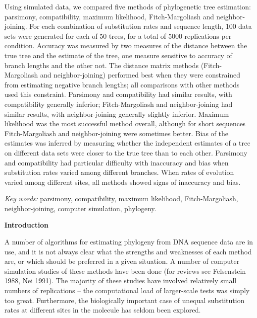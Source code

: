 	Using simulated data, we compared five methods of 
phylogenetic tree estimation:  parsimony, compatibility, 
maximum likelihood, Fitch-Margoliash and neighbor-joining.  For 
each combination of substitution rates and sequence length, 100 data 
sets were generated for each of 50 trees, for a total of 5000 
replications per condition.   Accuracy was measured by two measures of the
distance between the true tree and the estimate of the tree, one measure
sensitive to accuracy of branch lengths and the other not.  The distance
matrix methods (Fitch-Margoliash and neighbor-joining) performed best
when they were constrained from estimating negative branch lengths; all
comparisons with other methods used this constraint.  Parsimony
and compatibility had similar results, with compatibility generally
inferior; Fitch-Margoliash and neighbor-joining had similar results, with
neighbor-joining generally slightly inferior.  Maximum likelihood was the most 
successful method overall, although for short sequences Fitch-Margoliash 
and neighbor-joining were sometimes better.  Bias of the
estimates was inferred by measuring whether the independent estimates of a
tree on different data sets were closer to the true tree than to each other.
Parsimony and compatibility had particular difficulty with 
inaccuracy and bias when substitution rates varied among different branches.  
When rates of evolution varied among different sites, all methods showed signs 
of inaccuracy and bias.

\bigskip

\bigskip

{\it Key words:}  parsimony, compatibility, 
maximum likelihood, Fitch-Margoliash, neighbor-joining, computer simulation, phylogeny.
\newpage


\noindent
{\bf Introduction}
\bigskip

	A number of algorithms for estimating phylogeny from DNA 
sequence data are in use, and it is not always clear what the 
strengths and weaknesses of each method are, or which should be 
preferred in a given situation.  A number of computer simulation 
studies of these methods have been done (for reviews see 
Felsenstein 1988, Nei 1991).  The majority of these studies have 
involved relatively small numbers of replications -- the 
computational load of larger-scale tests was simply too great.  
Furthermore, the biologically important case of unequal substitution 
rates at different sites in the molecule has seldom been
explored.

